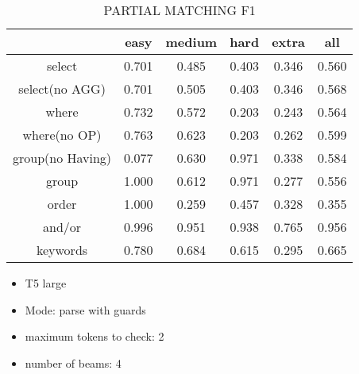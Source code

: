 \begin{table}[h!]
    \centering
    \begin{tabular}{|c|c|c|c|c|c|}
        \hline
                         & easy  & medium & hard  & extra & all   \\ \hline
        select           & 0.701 & 0.485  & 0.403 & 0.346 & 0.560 \\ \hline
        select(no AGG)   & 0.701 & 0.505  & 0.403 & 0.346 & 0.568 \\ \hline
        where            & 0.732 & 0.572  & 0.203 & 0.243 & 0.564 \\ \hline
        where(no OP)     & 0.763 & 0.623  & 0.203 & 0.262 & 0.599 \\ \hline
        group(no Having) & 0.077 & 0.630  & 0.971 & 0.338 & 0.584 \\ \hline
        group            & 1.000 & 0.612  & 0.971 & 0.277 & 0.556 \\ \hline
        order            & 1.000 & 0.259  & 0.457 & 0.328 & 0.355 \\ \hline
        and/or           & 0.996 & 0.951  & 0.938 & 0.765 & 0.956 \\ \hline

        keywords         & 0.780 & 0.684  & 0.615 & 0.295 & 0.665 \\ \hline
    \end{tabular}
    \caption{PARTIAL MATCHING F1 }

\end{table}
\pagebreak
\begin{itemize}
    \item T5 large
    \item Mode: parse with guards
    \item maximum tokens to check: 2
    \item number of beams: 4
\end{itemize}


